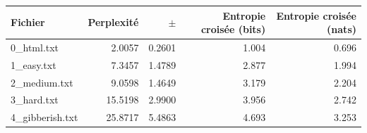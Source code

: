 \begin{tabular}{lrrrr}
\toprule
Fichier & Perplexité & $\pm$ & Entropie croisée (bits) & Entropie croisée (nats) \\
\midrule
0\_html.txt & 2.0057 & 0.2601 & 1.004 & 0.696 \\
1\_easy.txt & 7.3457 & 1.4789 & 2.877 & 1.994 \\
2\_medium.txt & 9.0598 & 1.4649 & 3.179 & 2.204 \\
3\_hard.txt & 15.5198 & 2.9900 & 3.956 & 2.742 \\
4\_gibberish.txt & 25.8717 & 5.4863 & 4.693 & 3.253 \\
\bottomrule
\end{tabular}
